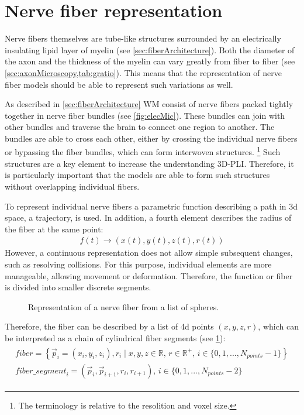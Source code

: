 \section{Nerve fiber representation}
\label{sec:nerve_fiber_representation}
%
Nerve fibers themselves are tube-like structures surrounded by an electrically insulating lipid layer of myelin (see \cref{sec:fiberArchitecture}).
Both the diameter of the axon and the thickness of the myelin can vary greatly from fiber to fiber (see \cref{sec:axonMicroscopy,tab:gratio}).
This means that the representation of nerve fiber models should be able to represent such variations as well.
\par
%
As described in \cref{sec:fiberArchitecture} \ac{WM} consist of nerve fibers packed tightly together in nerve fiber bundles (see \cref{fig:elecMic}).
These bundles can join with other bundles and traverse the brain to connect one region to another.
The bundles are able to cross each other, either by crossing the individual nerve fibers or bypassing the fiber bundles, which can form interwoven structures.
\footnote{The terminology  is relative to the resolition and voxel size.}
Such structures are a key element to increase the understanding \ac{3D-PLI}.
Therefore, it is particularly important that the models are able to form such structures without overlapping individual fibers.
\par
%
To represent individual nerve fibers a parametric function describing a path in 3d space, \ie{} a trajectory, is used.
In addition, a fourth element describes the radius of the fiber at the same point:
% 
\begin{align}
f(t) \rightarrow (x(t),y(t), z(t), r(t))
\end{align}
% 
However, a continuous representation does not allow simple subsequent changes, such as resolving collisions.
For this purpose, individual elements are more manageable, allowing movement or deformation.
Therefore, the function or fiber is divided into smaller discrete segments.
%
\begin{figure}[!t]
    \setlength{\tikzwidth}{0.85\textwidth}
    \centering
	\caption[]{Representation of a nerve fiber from a list of spheres.}
	\label{fig:fiberReb}
\end{figure}
%
Therefore, the fiber can be described by a list of 4d points $(x,y,z,r)$, which can be interpreted as a chain of cylindrical fiber segments (see \cref{fig:fiberReb}):
\begin{align}
\begin{gathered}
\mathit{fiber} = \left\{ \vec{p}_i=(x_i,y_i,z_i), r_i \mid x,y,z \in \mathbb{R}, \, r \in \mathbb{R^+}, \, i \in \{0,1,...,N_{\mathit{points}}-1\}\right\} \\
\mathit{fiber\_segment}_i = (\vec{p}_i, \vec{p}_{i+1}, r_i, r_{i+1}), \, i \in \{0,1,...,N_{\mathit{points}}-2\}
\end{gathered}
\end{align}
